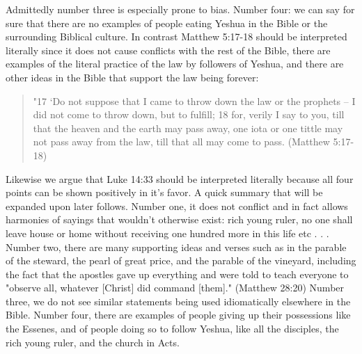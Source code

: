 \documentclass[11pt]{article}
\begin{document}
Admittedly number three is especially prone to bias. Number four: we can say for sure that there are no examples of people eating Yeshua in the Bible or the surrounding Biblical culture. In contrast Matthew 5:17-18 should be interpreted literally since it does not cause conflicts with the rest of the Bible, there are examples of the literal practice of the law by followers of Yeshua, and there are other ideas in the Bible that support the law being forever: 
\begin{quote}
"17 `Do not suppose that I came to throw down the law or the prophets -- I did not come to throw down, but to fulfill; 18 for, verily I say to you, till that the heaven and the earth may pass away, one iota or one tittle may not pass away from the law, till that all may come to pass. (Matthew 5:17-18) 
\end{quote}
 Likewise we argue that Luke 14:33 should be interpreted literally because all four points can be shown positively in it's favor. A quick summary that will be expanded upon later follows. Number one, it does not conflict and in fact allows harmonies of sayings that wouldn't otherwise exist: rich young ruler, no one shall leave house or home without receiving one hundred more in this life etc . . . Number two, there are many supporting ideas and verses such as in the parable of the steward, the pearl of great price, and the parable of the vineyard, including the fact that the apostles gave up everything and were told to teach everyone to "observe all, whatever [Christ] did command [them]." (Matthew 28:20) Number three, we do not see similar statements being used idiomatically elsewhere in the Bible. Number four, there are examples of people giving up their possessions like the Essenes, and of people doing so to follow Yeshua, like all the disciples, the rich young ruler, and the church in Acts.
\end{document}
